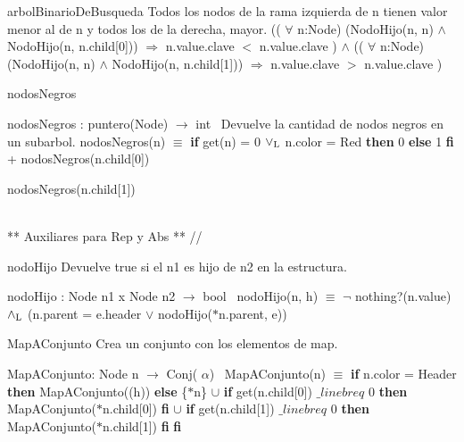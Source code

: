 \begin{DoxyParagraph}{arbol\+Binario\+De\+Busqueda}
Todos los nodos de la rama izquierda de n tienen valor menor al de n y todos los de la derecha, mayor. (( $\forall$ n\textquotesingle{}\+:Node) (Nodo\+Hijo(n\textquotesingle{}, n) $\land$ Nodo\+Hijo(n\textquotesingle{}, n.\+child\mbox{[}0\mbox{]})) $\Rightarrow$ n\textquotesingle{}.value.\+clave $<$ n.\+value.\+clave ) $\land$ (( $\forall$ n\textquotesingle{}\+:Node) (Nodo\+Hijo(n\textquotesingle{}, n) $\land$ Nodo\+Hijo(n\textquotesingle{}, n.\+child\mbox{[}1\mbox{]})) $\Rightarrow$ n\textquotesingle{}.value.\+clave $>$ n.\+value.\+clave )
\end{DoxyParagraph}
\begin{DoxyParagraph}{nodos\+Negros}


nodos\+Negros \+: puntero(\+Node) $\to$ int~\newline
 Devuelve la cantidad de nodos negros en un subarbol. nodos\+Negros(n) $\equiv$ {\bfseries if} get(n) = 0 $\lor_{\rm L}$ n.\+color = Red {\bfseries then} 0 {\bfseries else} 1 {\bfseries fi} + nodos\+Negros(n.\+child\mbox{[}0\mbox{]})
\begin{DoxyItemize}
\item nodos\+Negros(n.\+child\mbox{[}1\mbox{]}) 
\end{DoxyItemize}
\end{DoxyParagraph}


\begin{DoxyVerb}\\ ** Auxiliares para Rep y Abs ** //
\end{DoxyVerb}


\begin{DoxyParagraph}{nodo\+Hijo}
Devuelve true si el n1 es hijo de n2 en la estructura.

nodo\+Hijo \+: Node n1 x Node n2 $\to$ bool~\newline
 nodo\+Hijo(n, h) $\equiv$ $\lnot$ nothing?(n.\+value) $\land_{\rm L}$ (n.\+parent = e.\+header $\lor$ nodo\+Hijo($\ast$n.parent, e)) 
\end{DoxyParagraph}


\begin{DoxyParagraph}{Map\+A\+Conjunto}
Crea un conjunto con los elementos de map.

Map\+A\+Conjunto\+: Node n $\to$ Conj( $\alpha$)~\newline
 Map\+A\+Conjunto(n) $\equiv$ {\bfseries if} n.\+color = Header {\bfseries then} Map\+A\+Conjunto((h)) {\bfseries else} \{$\ast$n\} $\cup$ {\bfseries if} get(n.\+child\mbox{[}0\mbox{]}) $\_linebr eq$ 0 {\bfseries then} Map\+A\+Conjunto($\ast$n.child\mbox{[}0\mbox{]}) {\bfseries fi} $\cup$ {\bfseries if} get(n.\+child\mbox{[}1\mbox{]}) $\_linebr eq$ 0 {\bfseries then} Map\+A\+Conjunto($\ast$n.child\mbox{[}1\mbox{]}) {\bfseries fi} {\bfseries fi} 
\end{DoxyParagraph}


